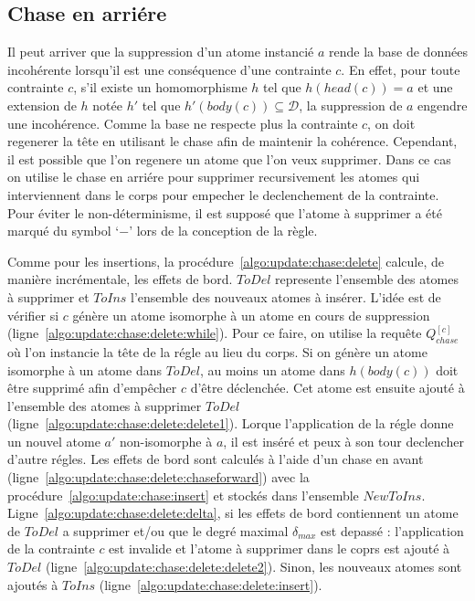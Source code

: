 \subsection{Chase en arriére}
Il peut arriver que la suppression d'un atome instancié $a$ rende la base de données incohérente lorsqu'il est une conséquence d'une contrainte $c$.
En effet, pour toute contrainte $c$, s'il existe un homomorphisme $h$ tel que $h(head(c)) = a$ et une extension de $h$ notée $h'$ tel que $h'(body(c)) \subseteq \mathcal{D}$, la suppression de $a$ engendre une incohérence.
Comme la base ne respecte plus la contrainte $c$, on doit regenerer la tête en utilisant le \gls{chase} afin de maintenir la cohérence.
Cependant, il est possible que l'on regenere un atome que l'on veux supprimer.
Dans ce cas on utilise le \gls{chase} en arriére pour supprimer recursivement les atomes qui interviennent dans le corps pour empecher le declenchement de la contrainte.
Pour éviter le non-déterminisme, il est supposé que l'atome à supprimer a été marqué du symbol `$-$' lors de la conception de la règle.

Comme pour les insertions, la procédure~\ref{algo:update:chase:delete} calcule, de manière incrémentale, les effets de bord.
$ToDel$ represente l'ensemble des atomes à supprimer et $ToIns$ l'ensemble des nouveaux atomes à insérer.
L'idée est de vérifier si $c$ génère un atome isomorphe à un atome en cours de suppression (ligne~\ref{algo:update:chase:delete:while}).
Pour ce faire, on utilise la requête $Q_{chase}^{[c]}$ où l'on instancie la tête de la régle au lieu du corps.
Si on génère un atome isomorphe à un atome dans $ToDel$, au moins un atome dans $h(body(c))$ doit être supprimé afin d'empêcher $c$ d'être déclenchée.
Cet atome est ensuite ajouté à l'ensemble des atomes à supprimer $ToDel$ (ligne~\ref{algo:update:chase:delete:delete1}).
Lorque l'application de la régle donne un nouvel atome $a'$ non-isomorphe à $a$, il est inséré et peux à son tour declencher d'autre régles.
Les effets de bord sont calculés à l'aide d'un \gls{chase} en avant (ligne~\ref{algo:update:chase:delete:chaseforward}) avec la procédure~\ref{algo:update:chase:insert} et stockés dans l'ensemble $NewToIns$.
Ligne~\ref{algo:update:chase:delete:delta}, si les effets de bord contiennent un atome de $ToDel$ a supprimer et/ou que le degré maximal $\delta_{max}$ est depassé : l'application de la contrainte $c$ est invalide et l'atome à supprimer dans le coprs est ajouté à $ToDel$ (ligne~\ref{algo:update:chase:delete:delete2}).
Sinon, les nouveaux atomes sont ajoutés à $ToIns$ (ligne~\ref{algo:update:chase:delete:insert}).

